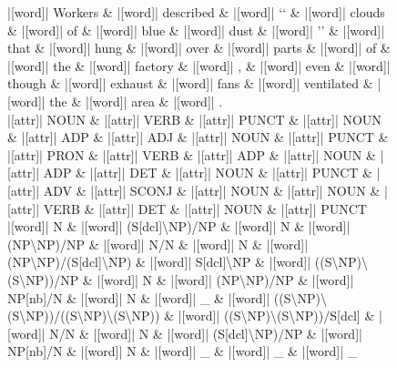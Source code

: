 \documentclass[10pt,a4paper]{article}
\begin{document}
\begin{figure}[h]
{\begin{dependency}[theme = simple]
\begin{deptext}[column sep=1em, row sep=0.1em]
|[word]| Workers \& |[word]| described \& |[word]| {}`{}` \& |[word]| clouds \& |[word]| of \& |[word]| blue \& |[word]| dust \& |[word]| '' \& |[word]| that \& |[word]| hung \& |[word]| over \& |[word]| parts \& |[word]| of \& |[word]| the \& |[word]| factory \& |[word]| , \& |[word]| even \& |[word]| though \& |[word]| exhaust \& |[word]| fans \& |[word]| ventilated \& |[word]| the \& |[word]| area \& |[word]| . \\
|[attr]| NOUN \& |[attr]| VERB \& |[attr]| PUNCT \& |[attr]| NOUN \& |[attr]| ADP \& |[attr]| ADJ \& |[attr]| NOUN \& |[attr]| PUNCT \& |[attr]| PRON \& |[attr]| VERB \& |[attr]| ADP \& |[attr]| NOUN \& |[attr]| ADP \& |[attr]| DET \& |[attr]| NOUN \& |[attr]| PUNCT \& |[attr]| ADV \& |[attr]| SCONJ \& |[attr]| NOUN \& |[attr]| NOUN \& |[attr]| VERB \& |[attr]| DET \& |[attr]| NOUN \& |[attr]| PUNCT \\
|[word]| N \& |[word]| (S{[}dcl{]}\textbackslash{}NP)/NP \& |[word]| N \& |[word]| (NP\textbackslash{}NP)/NP \& |[word]| N/N \& |[word]| N \& |[word]| (NP\textbackslash{}NP)/(S{[}dcl{]}\textbackslash{}NP) \& |[word]| S{[}dcl{]}\textbackslash{}NP \& |[word]| ((S\textbackslash{}NP)\textbackslash{}(S\textbackslash{}NP))/NP \& |[word]| N \& |[word]| (NP\textbackslash{}NP)/NP \& |[word]| NP{[}nb{]}/N \& |[word]| N \& |[word]| \_ \& |[word]| ((S\textbackslash{}NP)\textbackslash{}(S\textbackslash{}NP))/((S\textbackslash{}NP)\textbackslash{}(S\textbackslash{}NP)) \& |[word]| ((S\textbackslash{}NP)\textbackslash{}(S\textbackslash{}NP))/S{[}dcl{]} \& |[word]| N/N \& |[word]| N \& |[word]| (S{[}dcl{]}\textbackslash{}NP)/NP \& |[word]| NP{[}nb{]}/N \& |[word]| N \& |[word]| \_ \& |[word]| \_ \& |[word]| \_ \\
\end{deptext}




\end{dependency}}
\end{figure}
\end{document}
